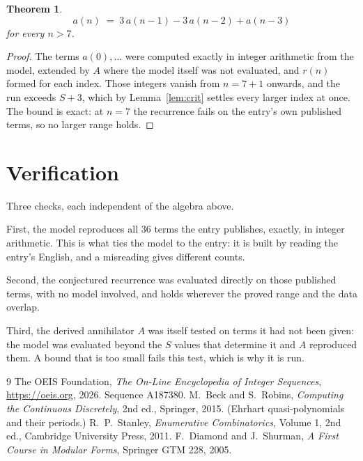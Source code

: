 \documentclass[11pt,a4paper]{article}
\theoremstyle{plain}
\newtheorem{theorem}{Theorem}
\theoremstyle{definition}
\begin{document}
\begin{theorem}
\[
a(n)\;=\;3\,a(n-1) - 3\,a(n-2) + a(n-3)
\]
for every $n>7$.
\end{theorem}

\begin{proof}
The terms $a(0),\dots$ were computed exactly in integer arithmetic from the model, extended by
$A$ where the model itself was not evaluated, and $r(n)$ formed for each index. Those integers
vanish from $n=7+1$ onwards, and the run exceeds $S+3$, which by
Lemma~\ref{lem:crit} settles every larger index at once. The bound is exact: at $n=7$ the recurrence fails on the entry's own published terms, so no larger range holds.
\end{proof}

\section{Verification}

Three checks, each independent of the algebra above.

First, the model reproduces all $36$ terms the entry publishes, exactly, in integer
arithmetic. This is what ties the model to the entry: it is built by reading the entry's
English, and a misreading gives different counts.

Second, the conjectured recurrence was evaluated directly on those published terms, with no
model involved, and holds wherever the proved range and the data overlap.

Third, the derived annihilator $A$ was itself tested on terms it had not been given: the model
was evaluated beyond the $S$ values that determine it and $A$ reproduced them. A bound that is
too small fails this test, which is why it is run.

\begin{thebibliography}{9}
 The OEIS Foundation, \emph{The On-Line Encyclopedia of Integer
Sequences}, \url{https://oeis.org}, 2026. Sequence A187380.
 M.~Beck and S.~Robins, \emph{Computing the Continuous Discretely},
2nd ed., Springer, 2015. (Ehrhart quasi-polynomials and their periods.)
 R.~P.~Stanley, \emph{Enumerative Combinatorics}, Volume 1, 2nd ed.,
Cambridge University Press, 2011.
 F.~Diamond and J.~Shurman, \emph{A First Course in Modular Forms},
Springer GTM 228, 2005.
\end{thebibliography}
\end{document}
